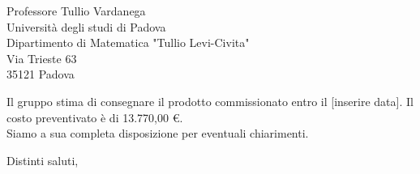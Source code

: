\documentclass[12pt]{letter} %
\begin{document}
\begin{letter}{Professore Tullio Vardanega \\ Università degli studi di Padova \\ Dipartimento di Matematica "Tullio Levi-Civita" \\ Via Trieste 63 \\ 35121 Padova}
\begin{addmargin}[2em]{2em}
  Il gruppo stima di consegnare il prodotto commissionato entro il [inserire data]. Il costo preventivato è di 13.770,00 \euro. \\ Siamo a sua completa disposizione per eventuali chiarimenti.
\end{addmargin}

\closing{Distinti saluti,}




\end{letter}
 
\end{document}

